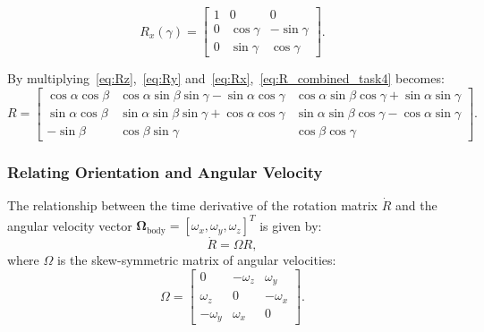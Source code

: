\documentclass[12pt]{article}
\begin{document}
\begin{equation}
\label{eq:Rx}
R_x(\gamma) =
\begin{bmatrix}
1 & 0 & 0 \\
0 & \cos\gamma & -\sin\gamma \\
0 & \sin\gamma & \cos\gamma
\end{bmatrix}.
\end{equation}

By multiplying~\ref{eq:Rz},~\ref{eq:Ry} and~\ref{eq:Rx},~\ref{eq:R_combined_task4} becomes:
\begin{equation}
\label{eq:R_full_task4}
R =
\begin{bmatrix}
\cos\alpha\cos\beta & \cos\alpha\sin\beta\sin\gamma - \sin\alpha\cos\gamma & \cos\alpha\sin\beta\cos\gamma + \sin\alpha\sin\gamma \\
\sin\alpha\cos\beta & \sin\alpha\sin\beta\sin\gamma + \cos\alpha\cos\gamma & \sin\alpha\sin\beta\cos\gamma - \cos\alpha\sin\gamma \\
-\sin\beta & \cos\beta\sin\gamma & \cos\beta\cos\gamma
\end{bmatrix}.
\end{equation}

\subsubsection{Relating Orientation and Angular Velocity}

The relationship between the time derivative of the rotation matrix \(\dot{R}\) and the angular velocity vector \(\boldsymbol{\Omega}_{\text{body}} = [\omega_x, \omega_y, \omega_z]^T\) is given by:
\begin{equation}
\label{eq:R_dot_relation}
\dot{R} = \Omega R,
\end{equation}
where \(\Omega\) is the skew-symmetric matrix of angular velocities:
\begin{equation}
\label{eq:omega_skew}
\Omega =
\begin{bmatrix}
0 & -\omega_z & \omega_y \\
\omega_z & 0 & -\omega_x \\
-\omega_y & \omega_x & 0
\end{bmatrix}.
\end{equation}
\end{document}
